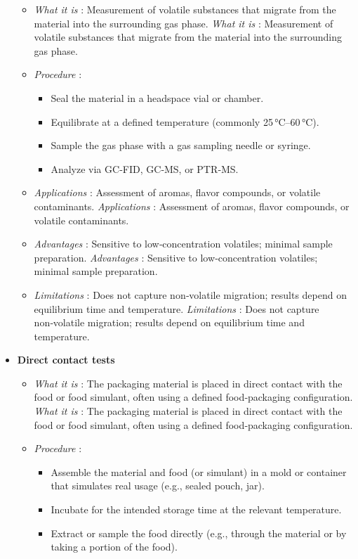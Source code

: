 \begin{itemize}
\begin{itemize}
\item \textit{What it is} : Measurement of volatile substances that migrate from the material into the surrounding gas phase.
\textit{What it is} : Measurement of volatile substances that migrate from the material into the surrounding gas phase.
\item 
\textit{Procedure} :
    \begin{itemize}
\item Seal the material in a headspace vial or chamber.
\item Equilibrate at a defined temperature (commonly 25 °C–60 °C).
\item Sample the gas phase with a gas sampling needle or syringe.
\item Analyze via GC‑FID, GC‑MS, or PTR‑MS.
    \end{itemize}
\item \textit{Applications} : Assessment of aromas, flavor compounds, or volatile contaminants.
\textit{Applications} : Assessment of aromas, flavor compounds, or volatile contaminants.
\item \textit{Advantages} : Sensitive to low‑concentration volatiles; minimal sample preparation.
\textit{Advantages} : Sensitive to low‑concentration volatiles; minimal sample preparation.
\item \textit{Limitations} : Does not capture non‑volatile migration; results depend on equilibrium time and temperature.
\textit{Limitations} : Does not capture non‑volatile migration; results depend on equilibrium time and temperature.
  \end{itemize}
\item 
\textbf{Direct contact tests}
  \begin{itemize}
\item \textit{What it is} : The packaging material is placed in direct contact with the food or food simulant, often using a defined food‑packaging configuration.
\textit{What it is} : The packaging material is placed in direct contact with the food or food simulant, often using a defined food‑packaging configuration.
\item 
\textit{Procedure} :
    \begin{itemize}
\item Assemble the material and food (or simulant) in a mold or container that simulates real usage (e.g., sealed pouch, jar).
\item Incubate for the intended storage time at the relevant temperature.
\item Extract or sample the food directly (e.g., through the material or by taking a portion of the food).

\end{itemize}
\end{itemize}
\end{itemize}
